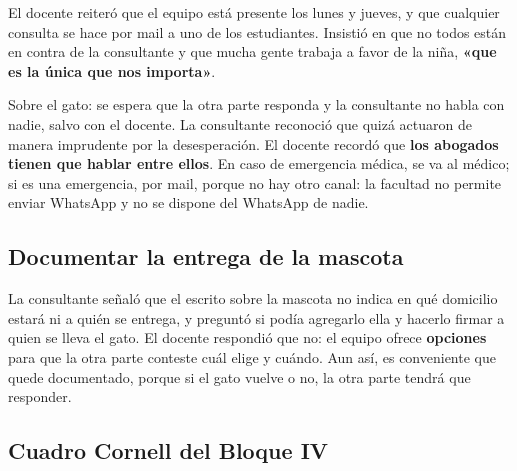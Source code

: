 \documentclass[12pt,oneside]{book}
\begin{document}
El docente reiteró que el equipo está presente los lunes y jueves, y que cualquier consulta se hace por mail a uno de los estudiantes. Insistió en que no todos están en contra de la consultante y que mucha gente trabaja a favor de la niña, \textbf{«que es la única que nos importa»}.

Sobre el gato: se espera que la otra parte responda y la consultante no habla con nadie, salvo con el docente. La consultante reconoció que quizá actuaron de manera imprudente por la desesperación. El docente recordó que \textbf{los abogados tienen que hablar entre ellos}. En caso de emergencia médica, se va al médico; si es una emergencia, por mail, porque no hay otro canal: la facultad no permite enviar WhatsApp y no se dispone del WhatsApp de nadie.

\subsection{Documentar la entrega de la mascota}

La consultante señaló que el escrito sobre la mascota no indica en qué domicilio estará ni a quién se entrega, y preguntó si podía agregarlo ella y hacerlo firmar a quien se lleva el gato. El docente respondió que no: el equipo ofrece \textbf{opciones} para que la otra parte conteste cuál elige y cuándo. Aun así, es conveniente que quede documentado, porque si el gato vuelve o no, la otra parte tendrá que responder.

\subsection*{Cuadro Cornell del Bloque IV}
\end{document}
